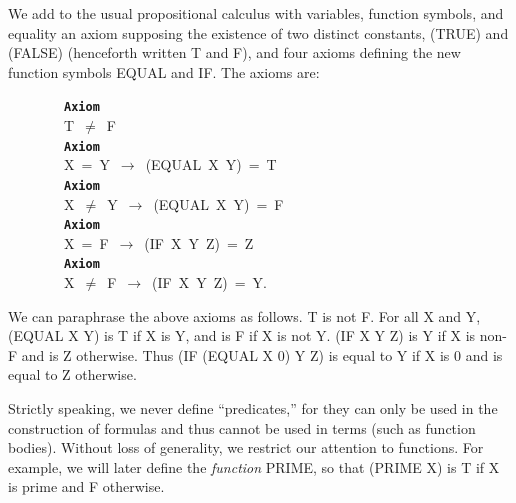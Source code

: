 \documentclass[11pt]{book}
\newenvironment{pubasis}{\begin{flushleft}\ttfamily\small}{\normalsize\rmfamily\end{flushleft}}
\newcommand{\axiomordefinition}[1]{\vspace{6pt}\texttt{\textbf{#1}}}
\newcommand{\pubinlineunderline}[1]{\emph{#1}}
\begin{document}
We add to the usual propositional calculus with variables, function
symbols, and equality an axiom
supposing the existence of two distinct constants, (TRUE) and (FALSE)
(henceforth  written T and F),
and four axioms defining the new function symbols EQUAL and IF.
The axioms are:
\begin{pubasis}
~~~~~~~~\axiomordefinition{Axiom}\\
~~~~~~~~T~$\neq$~F\\

~~~~~~~~\axiomordefinition{Axiom}\\
~~~~~~~~X~=~Y~$\rightarrow$~(EQUAL~X~Y)~=~T\\

~~~~~~~~\axiomordefinition{Axiom}\\
~~~~~~~~X~$\neq$~Y~$\rightarrow$~(EQUAL~X~Y)~=~F\\

~~~~~~~~\axiomordefinition{Axiom}\\
~~~~~~~~X~=~F~$\rightarrow$~(IF~X~Y~Z)~=~Z\\

~~~~~~~~\axiomordefinition{Axiom}\\
~~~~~~~~X~$\neq$~F~$\rightarrow$~(IF~X~Y~Z)~=~Y.\\
\end{pubasis}
We can paraphrase the above axioms as follows.  T is not F.  For all X and Y,
(EQUAL X Y) is T if X is Y,
and is F if X is not Y.
(IF X Y Z) is Y if X is non-F and is Z otherwise.
Thus
(IF (EQUAL X 0) Y Z)
is equal to Y if X is 0 and is equal to Z otherwise.

Strictly speaking, we never define ``predicates,'' for they can only be used
in the construction of
formulas and thus cannot be used in terms (such as function
bodies).  Without loss of generality, we restrict our attention to
functions.
For example, we will later define
the \pubinlineunderline{function} PRIME, so that (PRIME X) is T if X is prime and F
otherwise.
\end{document}
